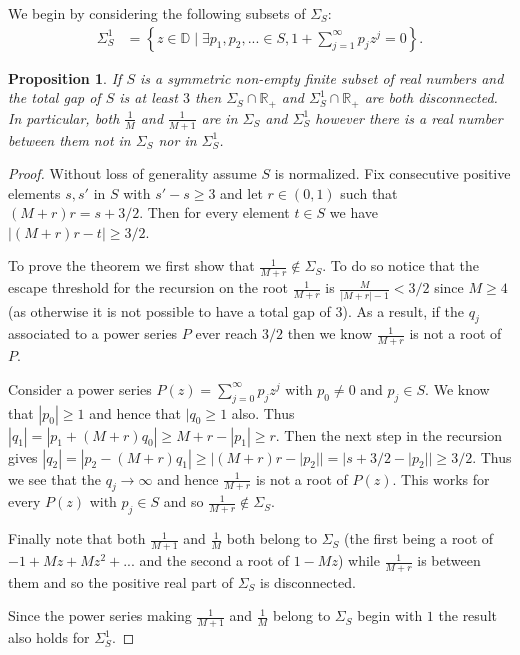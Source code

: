 \documentclass[11pt]{amsart}
\newtheorem{proposition}[theorem]{Proposition}
\numberwithin{theorem}{section} %
\numberwithin{corollary}{section}
\numberwithin{lemma}{section}
\numberwithin{proposition}{section}
\numberwithin{definition}{section}
\begin{document}
We begin by considering the following subsets of $\Sigma_S$:
\begin{align*}
\Sigma_S^{1} &= \left\{ z \in \mathbb{D} \mid \exists p_1, p_2, ... \in S, 1+ \sum_{j=1}^\infty p_jz^j = 0 \right\}.
\end{align*}




\begin{proposition}
If $S$ is a symmetric non-empty finite subset of real numbers and the total gap of $S$ is at least $3$ then $\Sigma_S \cap \mathbb{R_+}$ and $\Sigma_S^1 \cap \mathbb{R_+}$ are both disconnected. In particular, both $\frac{1}{M}$ and $\frac{1}{M+1}$ are in $\Sigma_S$ and $\Sigma_S^1$ however there is a real number between them not in $\Sigma_S$ nor in $\Sigma_S^1$.
\end{proposition}

\begin{proof}
Without loss of generality assume $S$ is normalized. Fix consecutive positive elements $s, s'$ in $S$ with $s'-s \geqslant 3$ and let $r\in (0, 1)$ such that $(M+r)r = s + 3/2$. Then for every element $t \in S$ we have $|(M+r)r-t| \geq 3/2$. 

To prove the theorem we first show that $\frac{1}{M+r} \notin \Sigma_S$. To do so notice that the escape threshold for the recursion on the root $\frac{1}{M+r}$ is $\frac{M}{|M+r|-1} < 3/2$ since $M \geqslant 4$ (as otherwise it is not possible to have a total gap of $3$). As a result, if the $q_j$ associated to a power series $P$ ever reach $3/2$ then we know $\frac{1}{M+r}$ is not a root of $P$.

Consider a power series $P(z) = \sum_{j=0}^\infty p_jz^j$ with $p_0 \neq 0$ and $p_j \in S$. We know that $|p_0| \geqslant 1$ and hence that $|q_0 \geqslant 1$ also. Thus $|q_1| = |p_1 + (M+r)q_0| \geqslant M+r - |p_1| \geqslant r$. Then the next step in the recursion gives $|q_2| = |p_2 - (M+r)q_1| \geqslant |(M+r)r - |p_2|| = |s+3/2 - |p_2|| \geqslant 3/2$. Thus we see that the $q_j \rightarrow \infty$ and hence $\frac{1}{M+r}$ is not a root of $P(z)$. This works for every $P(z)$ with $p_j \in S$ and so $\frac{1}{M+r} \notin \Sigma_S$. 

Finally note that both $\frac{1}{M+1}$ and $\frac{1}{M}$ both belong to $\Sigma_S$ (the first being a root of $-1 + Mz + Mz^2 +...$ and the second a root of $1-Mz$) while $\frac{1}{M+r}$ is between them and so the positive real part of $\Sigma_S$ is disconnected.

Since the power series making $\frac{1}{M+1}$ and $\frac{1}{M}$ belong to $\Sigma_S$ begin with $1$ the result also holds for $\Sigma_S^1$.


\end{proof}
\end{document}

